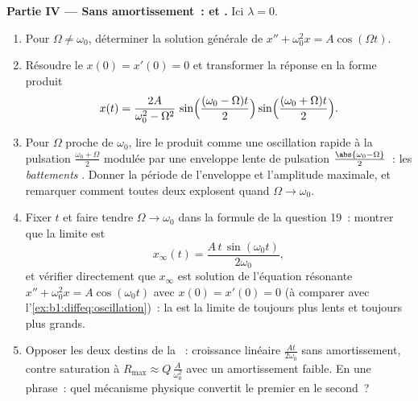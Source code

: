 \begin{problem}
\medskip
\noindent\textbf{Partie IV --- Sans amortissement~:  et
.} Ici $\lambda = 0$.
\begin{enumerate}[resume]
  \item Pour $\Omega \neq \omega_0$, déterminer la solution générale
        de $x'' + \omega_0^2 x = A\cos(\Omega t)$.
  \item Résoudre le  $x(0) = x'(0) = 0$ et
        transformer la réponse en la forme produit
        \[
        x(t) = \frac{2A}{\omega_0^2 - \Omega^2}\,
        \sin\Bigl(\frac{(\omega_0 - \Omega)t}2\Bigr)
        \sin\Bigl(\frac{(\omega_0 + \Omega)t}2\Bigr) .
        \]
  \item Pour $\Omega$ proche de $\omega_0$, lire le produit comme une
        oscillation rapide à la pulsation $\frac{\omega_0 + \Omega}2$
        modulée par une enveloppe lente de pulsation
        $\frac{\abs{\omega_0 - \Omega}}2$~: les \emph{battements}
        . Donner la période de l'enveloppe et
        l'amplitude maximale, et remarquer comment toutes deux
        explosent quand $\Omega \to \omega_0$.
  \item Fixer $t$ et faire tendre $\Omega \to \omega_0$ dans la
        formule de la question 19~: montrer que la limite est
        \[
        x_\infty(t) = \frac{A\,t\,\sin(\omega_0 t)}{2\omega_0} ,
        \]
        et vérifier directement que $x_\infty$ est solution de
        l'équation résonante $x'' + \omega_0^2 x = A\cos(\omega_0 t)$
        avec $x(0) = x'(0) = 0$ (à comparer avec
        l'\cref{ex:b1:diffeq:oscillation})~: la  est la limite
        de  toujours plus lents et toujours plus grands.
  \item Opposer les deux destins de la ~: croissance linéaire
        $\frac{At}{2\omega_0}$ sans amortissement, contre saturation à
        $R_{\max} \approx Q\,\frac{A}{\omega_0^2}$ avec un
        amortissement faible. En une phrase~: quel mécanisme physique
        convertit le premier en le second~?
\end{enumerate}


\end{problem}
